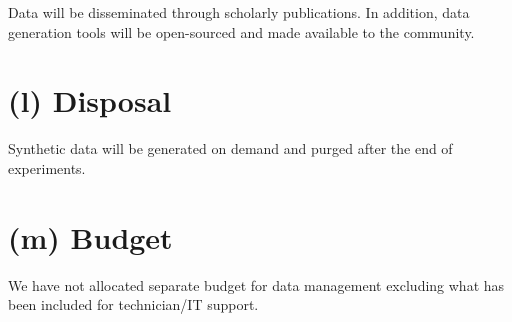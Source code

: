 \documentclass[11pt]{article}
\begin{document}
Data will be disseminated through scholarly publications. In addition, data generation tools will be open-sourced and made available to the community.

\noindent
\section*{(l) Disposal}

Synthetic data will be generated on demand and purged after the end of experiments.
\noindent
\section*{(m) Budget}

We have not allocated separate budget for data management excluding what has been included for
technician/IT support.
\end{document}
